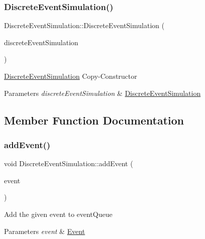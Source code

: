 \subsubsection{\texorpdfstring{Discrete\+Event\+Simulation()}{DiscreteEventSimulation()}\hspace{0.1cm}{\footnotesize\ttfamily [2/2]}}
{\footnotesize\ttfamily Discrete\+Event\+Simulation\+::\+Discrete\+Event\+Simulation (\begin{DoxyParamCaption}\item[{const \hyperlink{classDiscreteEventSimulation}{Discrete\+Event\+Simulation} \&}]{discrete\+Event\+Simulation }\end{DoxyParamCaption})}

\hyperlink{classDiscreteEventSimulation}{Discrete\+Event\+Simulation} Copy-\/\+Constructor 
\begin{DoxyParams}{Parameters}
{\em discrete\+Event\+Simulation} & \hyperlink{classDiscreteEventSimulation}{Discrete\+Event\+Simulation} \\
\hline
\end{DoxyParams}


\subsection{Member Function Documentation}
\mbox{\label{classDiscreteEventSimulation_a03770d2464931bc3555d4f34379aaa1e}} 
\subsubsection{\texorpdfstring{add\+Event()}{addEvent()}}
{\footnotesize\ttfamily void Discrete\+Event\+Simulation\+::add\+Event (\begin{DoxyParamCaption}\item[{\hyperlink{classEvent}{Event} $\ast$}]{event }\end{DoxyParamCaption})}

Add the given event to event\+Queue 
\begin{DoxyParams}{Parameters}
{\em event} & \hyperlink{classEvent}{Event} \\
\hline
\end{DoxyParams}
\mbox{\label{classDiscreteEventSimulation_a41c5492fdf2d5ef2a9a27200871caabd}} 
